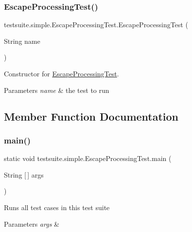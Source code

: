 \subsubsection{\texorpdfstring{Escape\+Processing\+Test()}{EscapeProcessingTest()}}
{\footnotesize\ttfamily testsuite.\+simple.\+Escape\+Processing\+Test.\+Escape\+Processing\+Test (\begin{DoxyParamCaption}\item[{String}]{name }\end{DoxyParamCaption})}

Constructor for \mbox{\hyperlink{classtestsuite_1_1simple_1_1_escape_processing_test}{Escape\+Processing\+Test}}.


\begin{DoxyParams}{Parameters}
{\em name} & the test to run \\
\hline
\end{DoxyParams}


\subsection{Member Function Documentation}
\mbox{\label{classtestsuite_1_1simple_1_1_escape_processing_test_acf0bde8d1c2ad44b686c7200a26a80ff}} 
\subsubsection{\texorpdfstring{main()}{main()}}
{\footnotesize\ttfamily static void testsuite.\+simple.\+Escape\+Processing\+Test.\+main (\begin{DoxyParamCaption}\item[{String \mbox{[}$\,$\mbox{]}}]{args }\end{DoxyParamCaption})\hspace{0.3cm}{\ttfamily [static]}}

Runs all test cases in this test suite


\begin{DoxyParams}{Parameters}
{\em args} & \\
\hline
\end{DoxyParams}
\mbox{\label{classtestsuite_1_1simple_1_1_escape_processing_test_a06117e478b5255ff186b2a98f7b08b50}} 
